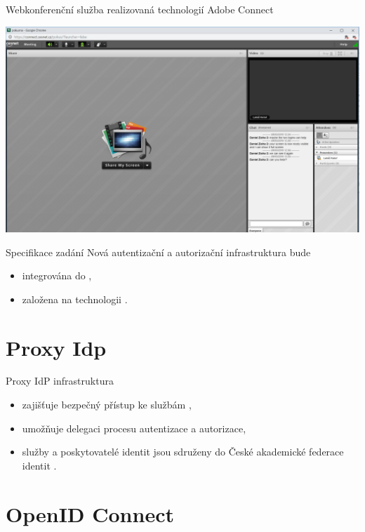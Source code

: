 \documentclass[
]{beamer}
\begin{document}
\begin{frame}{Webkonferenční služba realizovaná technologií Adobe Connect}

\includegraphics[width=\textwidth]{pics/adobe_connect.PNG}
\end{frame}

\begin{frame}{Specifikace zadání}
Nová autentizační a autorizační infrastruktura bude
\begin{itemize}
  \item integrována do  \cite{proxyIdpPresentation},
  \item založena na technologii  \cite{oidcPresentation}.
\end{itemize}
\end{frame}

\section[Proxy Idp]{Proxy Idp}
\begin{frame}{Proxy IdP infrastruktura}
\begin{itemize}
    \item zajišťuje bezpečný přístup ke službám ,
    \item umožňuje delegaci procesu autentizace a autorizace,
    \item služby a poskytovatelé identit jsou sdruženy do České akademické federace identit .

\end{itemize}
\end{frame}

\section[OpenID Connect]{OpenID Connect}
\end{document}
